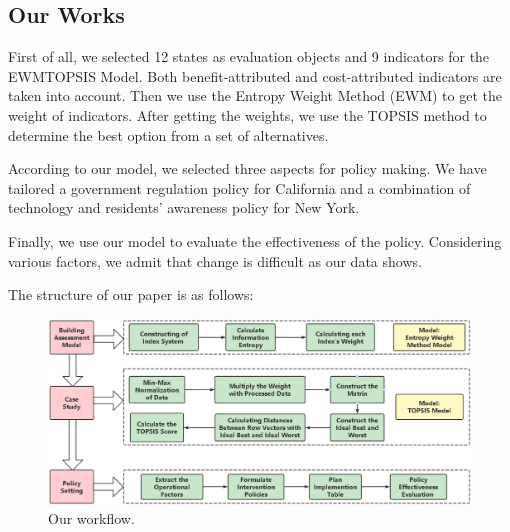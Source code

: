 \subsection{Our Works}
First of all, we selected 12 states as evaluation objects and 9 indicators for the EWMTOPSIS Model. Both benefit-attributed and cost-attributed indicators are taken into account. Then we use the Entropy Weight Method (EWM) to get the weight of indicators. After getting the weights, we use the TOPSIS method to determine the best option from a set of alternatives.

According to our model, we selected three aspects for policy making. We have tailored a government regulation policy for California and a combination of technology and residents' awareness policy for New York. 

Finally, we use our model to evaluate the effectiveness of the policy. Considering various factors, we admit that change is difficult as our data shows. 

The structure of our paper is as follows:

\begin{figure}[H]\centering
    \includegraphics[width=1\textwidth]{figures/Flowchart}
    \caption{Our workflow.} \label{fig:figure1}
\end{figure}



